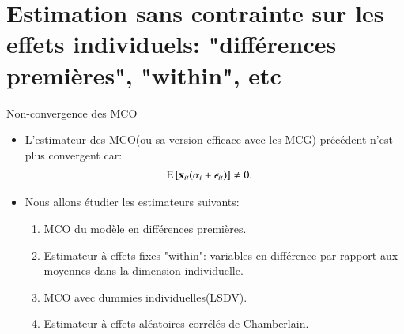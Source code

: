 \section{Estimation sans contrainte sur les effets individuels: "différences premières", "within", etc}
\frame{\sectionpage}
\begin{frame}[allowframebreaks]{Non-convergence des MCO}
    \begin{itemize}
        \item L'estimateur des MCO(ou sa version efficace avec les MCG) précédent n'est plus convergent 
        car:
        \begin{align*}
            \operatorname{E}\left[{\mathbf x}_{it}(\alpha_i + \epsilon_{it})\right]& \neq 0.
        \end{align*}
        \item Nous allons étudier les estimateurs suivants:
        \begin{enumerate}[$\star$]
            \item MCO du modèle en différences premières.
            \item Estimateur à effets fixes "within": variables en différence par rapport aux moyennes dans la dimension individuelle.
            \item MCO avec dummies individuelles(LSDV).
            \item Estimateur à effets aléatoires corrélés de Chamberlain.
            \end{enumerate}
    \end{itemize}
\end{frame}


